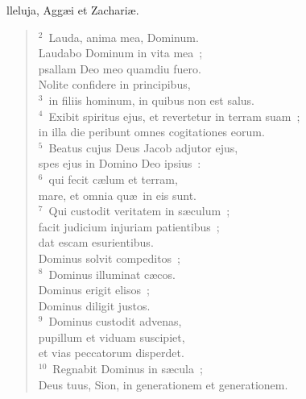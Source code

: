 \bchapter
{}lleluja, Agg\ae i et Zachari\ae .
\begin{flushleft}\begin{verse}\vspace{6pt}${}^{2}$~Lauda, anima mea, Dominum.\\ Laudabo Dominum in vita mea~;\\ psallam Deo meo quamdiu fuero.\\ Nolite confidere in principibus,\\
${}^{3}$~in filiis hominum, in quibus non est salus.\\
${}^{4}$~Exibit spiritus ejus, et revertetur in terram suam~;\\ in illa die peribunt omnes cogitationes eorum.\\
${}^{5}$~Beatus cujus Deus Jacob adjutor ejus,\\ spes ejus in Domino Deo ipsius~:\\
${}^{6}$~qui fecit c\ae lum et terram,\\ mare, et omnia qu\ae\ in eis sunt.\\
${}^{7}$~Qui custodit veritatem in s\ae culum~;\\ facit judicium injuriam patientibus~;\\ dat escam esurientibus.\\ Dominus solvit compeditos~;\\
${}^{8}$~Dominus illuminat c\ae cos.\\ Dominus erigit elisos~;\\ Dominus diligit justos.\\
${}^{9}$~Dominus custodit advenas,\\ pupillum et viduam suscipiet,\\ et vias peccatorum disperdet.\\
${}^{10}$~Regnabit Dominus in s\ae cula~;\\ Deus tuus, Sion, in generationem et generationem.\end{verse}\end{flushleft}



